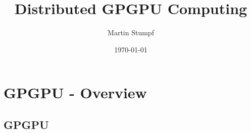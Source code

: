 \documentclass{beamer}
\title{Distributed GPGPU Computing}
\author{Martin Stumpf}
\institute{Ste||ar Group, LSU}
\date{\today}
\begin{document}
\frame{\titlepage}

\section{GPGPU - Overview}


\subsection{GPGPU}

\end{document}
